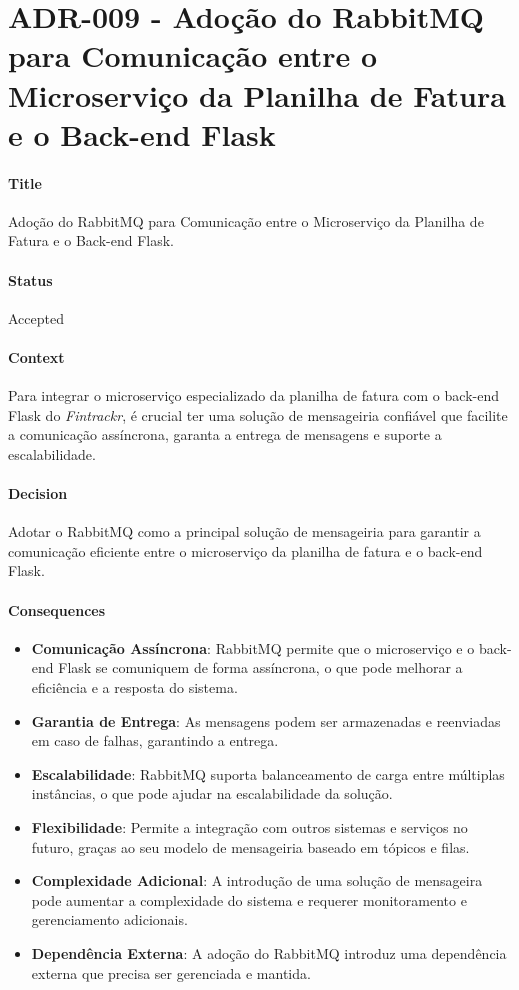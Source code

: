 \chapter{ADR-009 - Adoção do RabbitMQ para Comunicação entre o Microserviço da Planilha de Fatura e o Back-end Flask}
\label{apendiceADR009}

\subsubsection*{Title}
Adoção do RabbitMQ para Comunicação entre o Microserviço da Planilha de Fatura e o Back-end Flask.

\subsubsection*{Status}
Accepted

\subsubsection*{Context}
Para integrar o microserviço especializado da planilha de fatura com o back-end Flask do \textit{Fintrackr}, é crucial ter uma solução de mensageiria confiável que facilite a comunicação assíncrona, garanta a entrega de mensagens e suporte a escalabilidade.

\subsubsection*{Decision}
Adotar o RabbitMQ como a principal solução de mensageiria para garantir a comunicação eficiente entre o microserviço da planilha de fatura e o back-end Flask.

\subsubsection*{Consequences}
\begin{itemize}
	\item \textbf{Comunicação Assíncrona}: RabbitMQ permite que o microserviço e o back-end Flask se comuniquem de forma assíncrona, o que pode melhorar a eficiência e a resposta do sistema.
	\item \textbf{Garantia de Entrega}: As mensagens podem ser armazenadas e reenviadas em caso de falhas, garantindo a entrega.
	\item \textbf{Escalabilidade}: RabbitMQ suporta balanceamento de carga entre múltiplas instâncias, o que pode ajudar na escalabilidade da solução.
	\item \textbf{Flexibilidade}: Permite a integração com outros sistemas e serviços no futuro, graças ao seu modelo de mensageiria baseado em tópicos e filas.
	\item \textbf{Complexidade Adicional}: A introdução de uma solução de mensageira pode aumentar a complexidade do sistema e requerer monitoramento e gerenciamento adicionais.
	\item \textbf{Dependência Externa}: A adoção do RabbitMQ introduz uma dependência externa que precisa ser gerenciada e mantida.
\end{itemize}
